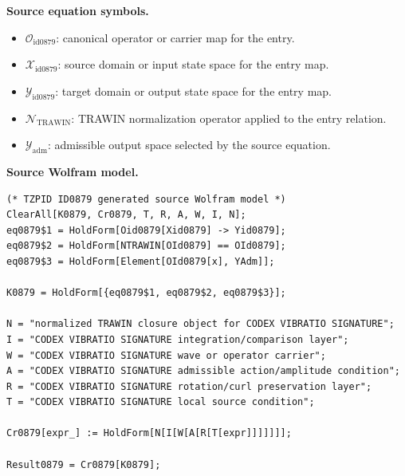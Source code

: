 \begin{minipage}[t]{0.49\linewidth}
\begingroup
\small
\raggedright
\textbf{Source equation symbols.}\par
\begin{itemize}[leftmargin=1.35em,itemsep=1pt,topsep=1pt,parsep=0pt]
    \item $\mathcal{O}_{\mathrm{id0879}}$: canonical operator or carrier map for the entry.
    \item $\mathcal{X}_{\mathrm{id0879}}$: source domain or input state space for the entry map.
    \item $\mathcal{Y}_{\mathrm{id0879}}$: target domain or output state space for the entry map.
    \item $\mathcal{N}_{\mathrm{TRAWIN}}$: TRAWIN normalization operator applied to the entry relation.
    \item $\mathcal{Y}_{\mathrm{adm}}$: admissible output space selected by the source equation.
\end{itemize}
\endgroup
\end{minipage}\hfill
\begin{minipage}[t]{0.47\linewidth}
\begingroup
\scriptsize
\raggedright
\textbf{Source Wolfram model.}\par
\begin{Verbatim}[fontsize=\tiny,breaklines=true,breakanywhere=true]
(* TZPID ID0879 generated source Wolfram model *)
ClearAll[K0879, Cr0879, T, R, A, W, I, N];
eq0879$1 = HoldForm[Oid0879[Xid0879] -> Yid0879];
eq0879$2 = HoldForm[NTRAWIN[OId0879] == OId0879];
eq0879$3 = HoldForm[Element[OId0879[x], YAdm]];

K0879 = HoldForm[{eq0879$1, eq0879$2, eq0879$3}];

N = "normalized TRAWIN closure object for CODEX VIBRATIO SIGNATURE";
I = "CODEX VIBRATIO SIGNATURE integration/comparison layer";
W = "CODEX VIBRATIO SIGNATURE wave or operator carrier";
A = "CODEX VIBRATIO SIGNATURE admissible action/amplitude condition";
R = "CODEX VIBRATIO SIGNATURE rotation/curl preservation layer";
T = "CODEX VIBRATIO SIGNATURE local source condition";

Cr0879[expr_] := HoldForm[N[I[W[A[R[T[expr]]]]]]];

Result0879 = Cr0879[K0879];
\end{Verbatim}
\endgroup
\end{minipage}

